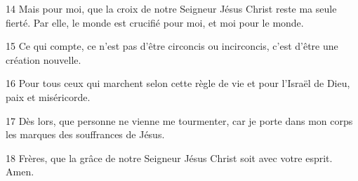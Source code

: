 
14 Mais pour moi, que la croix de notre Seigneur Jésus Christ reste ma seule fierté. Par elle, le monde est crucifié pour moi, et moi pour le monde.

15 Ce qui compte, ce n’est pas d’être circoncis ou incirconcis, c’est d’être une création nouvelle.

16 Pour tous ceux qui marchent selon cette règle de vie et pour l’Israël de Dieu, paix et miséricorde.

17 Dès lors, que personne ne vienne me tourmenter, car je porte dans mon corps les marques des souffrances de Jésus.

18 Frères, que la grâce de notre Seigneur Jésus Christ soit avec votre esprit. Amen.